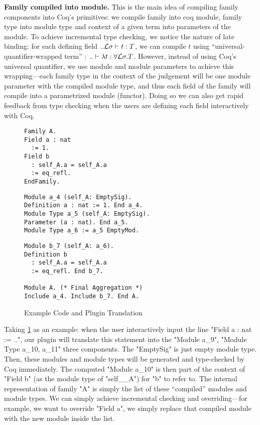 \textbf{Family compiled into module.} This is the main idea of compiling family components into Coq's primitives: we compile family into coq module, family type into module type and context of a given term into parameters of the module. To achieve incremental type checking, we notice the nature of late binding: for each defining field $ .. {\mathcal{L}}\sigma \vdash t : T $, we can compile $t$ using ``universal-quantifier-wrapped term'' : $.. \vdash \lambda t : \forall {\mathcal{L}} \sigma. T$. However, instead of using Coq's universal quantifier, we use module and module parameters to achieve this wrapping---each family type in the context of the judgement will be one module parameter with the compiled module type, and thus each field of the family will compile into a parametrized module (functor). Doing so we can also get rapid feedback from type checking when the users are defining each field interactively with Coq.
\begin{figure}
  \begin{minipage}[t]{0.25\linewidth}
\begin{verbatim}
Family A.
Field a : nat 
  := 1.
Field b 
  : self_A.a = self_A.a
  := eq_refl.
EndFamily.
\end{verbatim}
  \end{minipage}
  \begin{minipage}[t]{0.4\linewidth}
\begin{verbatim}
Module a_4 (self_A: EmptySig).
Definition a : nat := 1. End a_4.
Module Type a_5 (self_A: EmptySig).
Parameter (a : nat). End a_5.
Module Type a_6 := a_5 EmptyMod.
\end{verbatim}
  \end{minipage}
  \begin{minipage}[t]{0.3\linewidth}
\begin{verbatim}
Module b_7 (self_A: a_6).
Definition b 
  : self_A.a = self_A.a 
  := eq_refl. End b_7.
  
Module A. (* Final Aggregation *)
Include a_4. Include b_7. End A.
\end{verbatim}
  \end{minipage}
  \caption{Example Code and Plugin Translation}\label{fig:plugin-example1}
\end{figure}


Taking \cref{fig:plugin-example1} as an example: when the user interactively input the line "Field a : nat := ..", our plugin will translate this statement into the "Module a_9", "Module Type a_10, a_11" three components. {The "EmptySig" is just empty module type.} Then, these modules and module types will be generated and type-checked by Coq immediately. The computed "Module a_10" is then part of the context of "Field b" (as the module type of "self__A") for "b" to refer to. The internal representation of family "A" is simply the list of these ``compiled'' modules and module types. We can simply achieve incremental checking and overriding---for example, we want to override "Field a", we simply replace that compiled module with the new module inside the list. 

